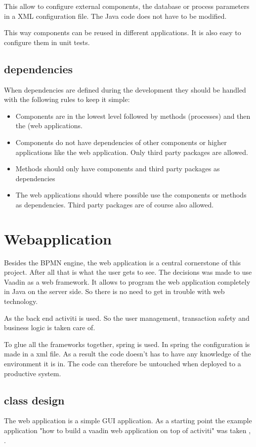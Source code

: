 \documentclass[paper=a4,twoside=false,BCOR=0mm,DIV=calc,fontsize=12pt]{scrartcl}
\begin{document}
This allow to configure external components, the database or process parameters in a XML configuration file. The Java code does not have to be modified. 

This way components can be reused in different applications. It is also easy to configure them in unit tests.

\subsection{dependencies}
When dependencies are defined during the development they should be handled with the following rules to keep it simple:
\begin{itemize}
 \item Components are in the lowest level followed by methods (processes) and then the (web applications.
 \item Components do not have dependencies of other components or higher applications like the web application. Only third party packages are allowed.
 \item Methods should only have components and third party packages as dependencies
 \item The web applications should where possible use the components or methods as dependencies. Third party packages are of course also allowed.
\end{itemize}

\section{Webapplication}
Besides the BPMN engine, the web application is a central cornerstone of this project. After all that is what the user gets to see.
The decisions was made to use Vaadin \cite{vaadin} as a web framework. It allows to program the web application completely in Java on the server side. So there is
no need to get in trouble with web technology.

As the back end activiti is used. So the user management, transaction safety and business logic is taken care of.

To glue all the frameworks together, spring is used. In spring the configuration is made in a xml file. As a result the code doesn't has to have any 
knowledge of the environment it is in. The code can therefore be untouched when deployed to a productive system.



\subsection{class design}
The web application is a simple GUI application. As a starting point the example application "how to build a vaadin web application on top of activiti" was taken \cite{vaadinactivitwebapp}, \cite{vaadinactivitwebapp2}.
\end{document}
